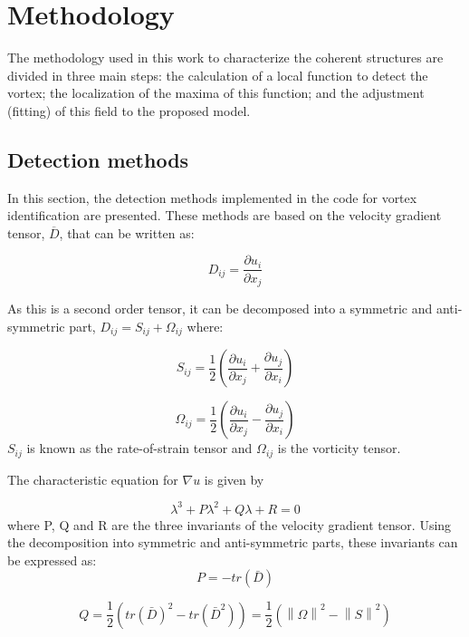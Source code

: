 \documentclass[12pt, a4paper, openany]{memoir}
\newcommand{\norm}[1]{\left\lVert#1\right\rVert}
\begin{document}
\chapter{Methodology}

The methodology used in this work to characterize the coherent structures are divided in three main steps: the calculation of a local function to detect the vortex; the localization of the maxima of this function; and the adjustment (fitting) of this field to the proposed model.

\section{Detection methods}
In this section, the detection methods implemented in the code for vortex identification are presented. These methods are based on the velocity gradient tensor, $\overline{D}$, that can be written as:

\begin{equation}
D_{ij} = \frac{\partial u_i}{\partial x_j}
\end{equation}

As this is a second order tensor, it can be decomposed into a symmetric and anti-symmetric part, $D_{ij} = S_{ij} + \Omega_{ij}$ where:

\begin{equation}
S_{ij} = \frac{1}{2} \left(\frac{\partial u_i}{\partial x_j} + \frac{\partial u_j}{\partial x_i}\right)
\end{equation}

\begin{equation}
\Omega_{ij} = \frac{1}{2} \left(\frac{\partial u_i}{\partial x_j} - \frac{\partial u_j}{\partial x_i}\right)
\end{equation}
$S_{ij}$ is known as the rate-of-strain tensor and $\Omega_{ij}$ is the vorticity tensor.

The characteristic equation for $\nabla u$ is given by

\begin{equation}
\lambda^3 + P \lambda^2 + Q \lambda + R = 0
\end{equation}
where P, Q and R are the three invariants of the velocity gradient tensor. Using the decomposition into symmetric and anti-symmetric parts, these invariants can be expressed as:
\begin{equation}
P = -tr(\bar{D})
\end{equation}

\begin{equation}
Q = \frac{1}{2} (tr(\bar{D})^2 -tr(\bar{D}^2)) = \frac{1}{2} (\norm{\Omega}^2 - \norm{S}^2)
\end{equation}
\end{document}
